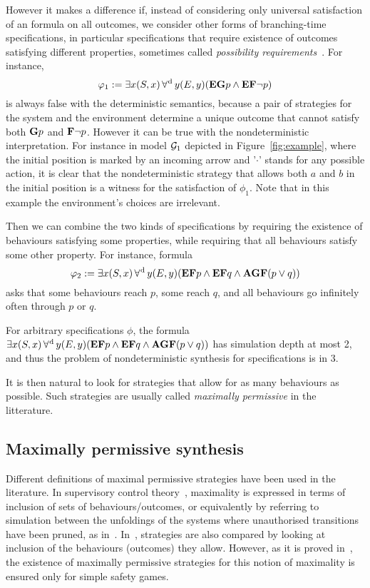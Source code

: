 However it makes a difference if, instead of considering only
universal satisfaction of an \LTL formula on all outcomes, we consider
other forms of branching-time specifications, in particular
specifications that require existence of outcomes satisfying different
properties, sometimes called \emph{possibility requirements}~\cite{kupferman1997module}. For instance,
\[\varphi_1:=\exists x (S,x) \operatorname*{\forall^{\hskip.5pt\text{d}}} y (E,y) ({\bf E} {\bf G} p
  \wedge {\bf E} {\bf F} \neg p)\]
is always false with the deterministic semantics, because a pair of
strategies for the system and the environment determine a unique
outcome that cannot satisfy both ${\bf G} p$ and ${\bf F}\neg p$.
However it can be true with the
nondeterministic interpretation.
For instance in model $\CGS_1$ depicted in Figure~\ref{fig:example}, where the
initial position is marked by an incoming arrow and  '$\cdot$' stands
for any possible action, it is clear that the nondeterministic
strategy that allows both $a$ and $b$ in the initial position is a
witness for the satisfaction of $\phi_1$.
Note that in this example the environment's choices are irrelevant.

Then we can combine the two kinds of specifications by  requiring the
existence of behaviours satisfying some properties, while requiring
that all  behaviours satisfy some other property.
For instance, formula
\[\varphi_2:=\exists x (S,x) \operatorname*{\forall^{\hskip.5pt\text{d}}}y (E,y)({\bf E} {\bf F} p \wedge {\bf E} {\bf F}
  q \wedge {\bf A} {\bf G} {\bf F} (p\vee q))\]
  asks that some behaviours 
 reach $p$, some  reach $q$, and all behaviours go infinitely
 often through $p$ or $q$.

For arbitrary \CTLs specifications $\phi$, the formula $\exists x (S,x) \operatorname*{\forall^{\hskip.5pt\text{d}}}y (E,y)({\bf E} {\bf F} p \wedge {\bf E} {\bf F}
  q \wedge {\bf A} {\bf G} {\bf F} (p\vee q))$ has simulation depth at most 2,
  and thus the problem of nondeterministic synthesis for \CTLs
  specifications is in 3\EXPTIME.
 
It is then natural to look for  strategies that allow for as many
behaviours as possible. Such strategies are usually called
\emph{maximally permissive} in the litterature.



\subsection{Maximally permissive synthesis}
\label{sec-max-perm}

Different definitions of maximal permissive strategies have been used
in the literature. In supervisory control
theory~\cite{ramadge1987supervisory}, maximality is expressed in terms
of inclusion of sets of behaviours/outcomes, or equivalently by
referring to simulation between the unfoldings of the systems where
unauthorised transitions have been pruned, as
in~\cite{pinchinat2005you}.  In~\cite{bernet2002permissive},
strategies are also compared by looking at inclusion of the behaviours
(outcomes) they allow. However, as it is proved
in~\cite{bernet2002permissive}, the existence of maximally permissive
strategies for this notion of maximality is ensured only for simple
safety games.

